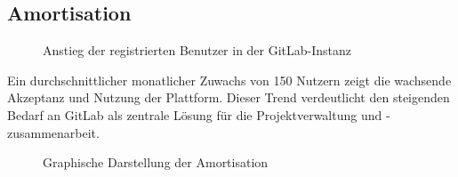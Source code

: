 \subsection{Amortisation}
\label{app:User}
\begin{figure}[htb]
    \centering
    \caption{Anstieg der registrierten Benutzer in der GitLab-Instanz}
    \label{fig:totalUser}
    \end{figure}
    
Ein durchschnittlicher monatlicher Zuwachs von 150 Nutzern zeigt die wachsende Akzeptanz und Nutzung der Plattform. Dieser Trend verdeutlicht den steigenden Bedarf an GitLab als zentrale Lösung für die Projektverwaltung und -zusammenarbeit.

\label{app:amo}
\begin{figure}[htb]
    \centering
    \caption{Graphische Darstellung der Amortisation}
\end{figure}